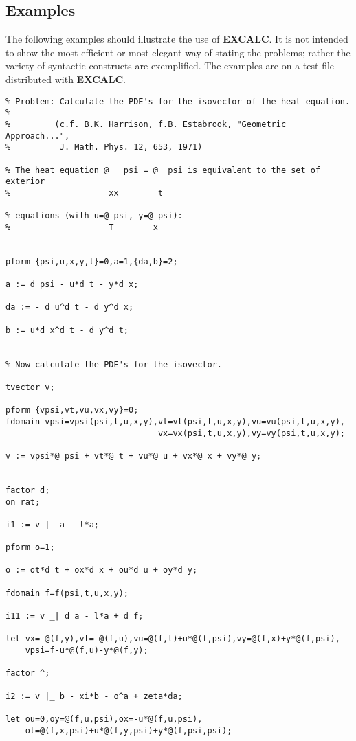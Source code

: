 \subsection{Examples}

The following examples should illustrate the use of {\bf EXCALC}. It is not
intended to show the most efficient or most elegant way of stating the
problems; rather the variety of syntactic constructs are exemplified.
The examples are on a test file distributed with {\bf EXCALC}.
{\small
\begin{verbatim}
% Problem: Calculate the PDE's for the isovector of the heat equation.
% --------
%         (c.f. B.K. Harrison, f.B. Estabrook, "Geometric Approach...",
%          J. Math. Phys. 12, 653, 1971)

% The heat equation @   psi = @  psi is equivalent to the set of exterior
%                    xx        t

% equations (with u=@ psi, y=@ psi):
%                    T        x


pform {psi,u,x,y,t}=0,a=1,{da,b}=2;

a := d psi - u*d t - y*d x;

da := - d u^d t - d y^d x;

b := u*d x^d t - d y^d t;


% Now calculate the PDE's for the isovector.

tvector v;

pform {vpsi,vt,vu,vx,vy}=0;
fdomain vpsi=vpsi(psi,t,u,x,y),vt=vt(psi,t,u,x,y),vu=vu(psi,t,u,x,y),
                               vx=vx(psi,t,u,x,y),vy=vy(psi,t,u,x,y);

v := vpsi*@ psi + vt*@ t + vu*@ u + vx*@ x + vy*@ y;


factor d;
on rat;

i1 := v |_ a - l*a;

pform o=1;

o := ot*d t + ox*d x + ou*d u + oy*d y;

fdomain f=f(psi,t,u,x,y);

i11 := v _| d a - l*a + d f;

let vx=-@(f,y),vt=-@(f,u),vu=@(f,t)+u*@(f,psi),vy=@(f,x)+y*@(f,psi),
    vpsi=f-u*@(f,u)-y*@(f,y);

factor ^;

i2 := v |_ b - xi*b - o^a + zeta*da;

let ou=0,oy=@(f,u,psi),ox=-u*@(f,u,psi),
    ot=@(f,x,psi)+u*@(f,y,psi)+y*@(f,psi,psi);


\end{verbatim}}
